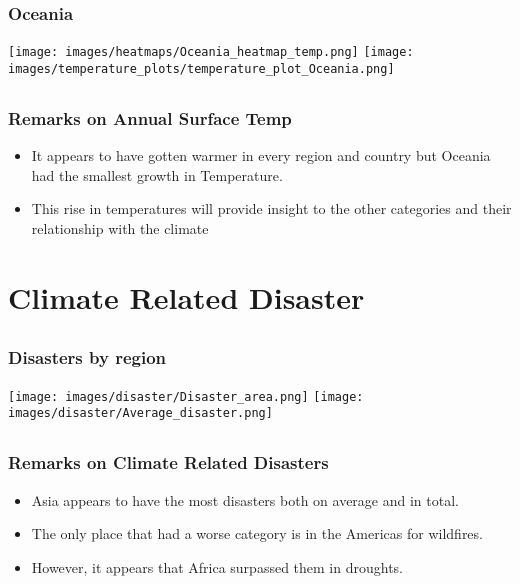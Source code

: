 \documentclass[handout, xcolor=dvipsnames]{beamer}
\begin{document}
\begin{frame}
	\frametitle{Oceania}
	\begin{center} 
		\texttt{[image: images/heatmaps/Oceania\_heatmap\_temp.png]} \hspace{1pt}
            \texttt{[image: images/temperature\_plots/temperature\_plot\_Oceania.png]} \hspace{1pt}
	\end{center}
\end{frame}
    
\subsection{}
\begin{frame}
	\frametitle{Remarks on Annual Surface Temp}
	\begin{itemize}
	\item It appears to have gotten warmer in every region and country but Oceania             had the smallest growth in Temperature. \\[1cm]
        \item This rise in temperatures will provide insight to the other categories and their relationship with the climate
    \end{itemize}
\end{frame}


\section{Climate Related Disaster}  


\subsection{}
\begin{frame}
	\frametitle{Disasters by region} %
	\begin{center} 
		\texttt{[image: images/disaster/Disaster\_area.png]} \hspace{1pt}
		\texttt{[image: images/disaster/Average\_disaster.png]}
	\end{center}
\end{frame}

\subsection{}
\begin{frame}
	\frametitle{Remarks on Climate Related Disasters}
	\begin{itemize}
	\item Asia appears to have the most disasters both on average and in total. 
        \item The only place that had a worse category is in the Americas for wildfires. 
        \item However, it appears that Africa surpassed them in droughts. 
    \end{itemize}
\end{frame}
\end{document}
